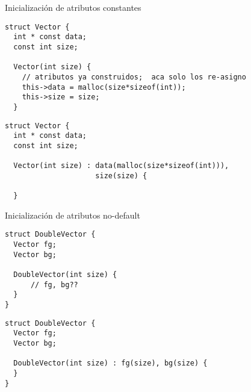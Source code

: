 \begin{frame}[fragile]{Inicializaci\'on de atributos constantes}
        \begin{lstlisting}[style=normal,firstnumber=1,linebackgroundcolor={%
                 \btLstHLR<1>{2,7}%
                 \btLstHLR<2>{3,8}%
         }]
struct Vector {
  int * const data;
  const int size;
  
  Vector(int size) {
    // atributos ya construidos;  aca solo los re-asigno
    this->data = malloc(size*sizeof(int));
    this->size = size;
  }
        \end{lstlisting}
        \pause
        \pause
        \begin{lstlisting}[style=normal,firstnumber=1,linebackgroundcolor={%
                 \btLstHLB<3>{2,5}%
                 \btLstHLB<4>{3,6}%
         }]
struct Vector {
  int * const data;
  const int size;
  
  Vector(int size) : data(malloc(size*sizeof(int))), 
                     size(size) {

  }
        \end{lstlisting}
\end{frame}

\begin{frame}[fragile]{Inicializaci\'on de atributos no-default}
    \begin{lstlisting}[style=normal,firstnumber=1,linebackgroundcolor={%
                 \btLstHLR<1>{5}%
         }]
struct DoubleVector {
  Vector fg;
  Vector bg;
  
  DoubleVector(int size) {
      // fg, bg??
  }
}
        \end{lstlisting}
        \pause
    \begin{lstlisting}[style=normal,firstnumber=1,linebackgroundcolor={%
                 \btLstHLB<2>{5}%
         }]
struct DoubleVector {
  Vector fg;
  Vector bg;
  
  DoubleVector(int size) : fg(size), bg(size) {
  }
}
        \end{lstlisting}
\end{frame}

